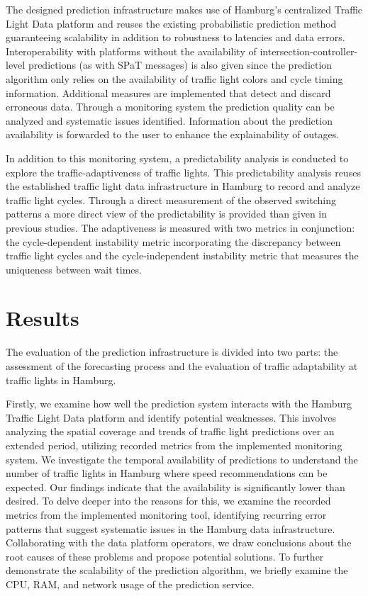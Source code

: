 \begin{Summary}
The designed prediction infrastructure makes use of Hamburg's centralized Traffic Light Data platform and reuses the existing probabilistic prediction method  \cite{pape_untersuchung_2012, protschky_extensive_2014, protschky_adaptive_2014} guaranteeing scalability in addition to robustness to latencies and data errors. Interoperability with platforms without the availability of intersection-controller-level predictions (as with SPaT messages) is also given since the prediction algorithm only relies on the availability of traffic light colors and cycle timing information. Additional measures are implemented that detect and discard erroneous data. Through a monitoring system the prediction quality can be analyzed and systematic issues identified. Information about the prediction availability is forwarded to the user to enhance the explainability of outages. 

In addition to this monitoring system, a predictability analysis is conducted to explore the traffic-adaptiveness of traffic lights. This predictability analysis reuses the established traffic light data infrastructure in Hamburg to record and analyze traffic light cycles. Through a direct measurement of the observed switching patterns a more direct view of the predictability is provided than given in previous studies. The adaptiveness is measured with two metrics in conjunction: the cycle-dependent instability metric incorporating the discrepancy between traffic light cycles and the cycle-independent instability metric that measures the uniqueness between wait times.
\end{Summary}

\section{Results}

The evaluation of the prediction infrastructure is divided into two parts: the assessment of the forecasting process and the evaluation of traffic adaptability at traffic lights in Hamburg.

Firstly, we examine how well the prediction system interacts with the Hamburg Traffic Light Data platform and identify potential weaknesses. This involves analyzing the spatial coverage and trends of traffic light predictions over an extended period, utilizing recorded metrics from the implemented monitoring system. We investigate the temporal availability of predictions to understand the number of traffic lights in Hamburg where speed recommendations can be expected. Our findings indicate that the availability is significantly lower than desired. To delve deeper into the reasons for this, we examine the recorded metrics from the implemented monitoring tool, identifying recurring error patterns that suggest systematic issues in the Hamburg data infrastructure. Collaborating with the data platform operators, we draw conclusions about the root causes of these problems and propose potential solutions. To further demonstrate the scalability of the prediction algorithm, we briefly examine the CPU, RAM, and network usage of the prediction service.

